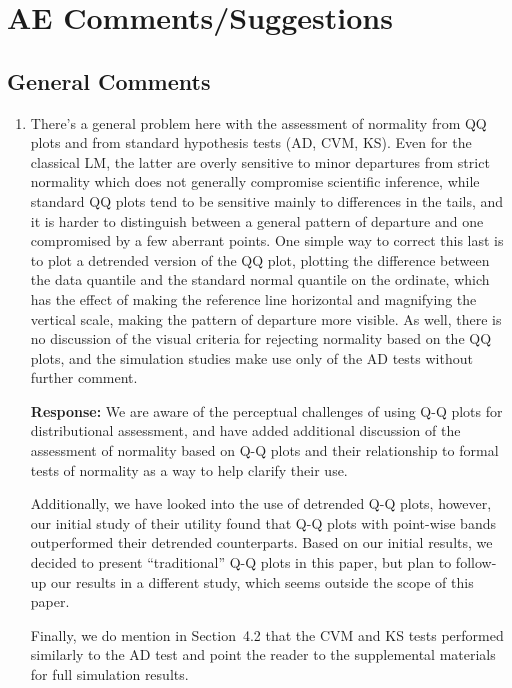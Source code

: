 \documentclass[11pt]{article}
\begin{document}
\section*{AE Comments/Suggestions}

\subsection*{General Comments}

\begin{enumerate}
\item There's a general problem here with the assessment of normality from QQ plots and from standard hypothesis tests (AD, CVM, KS). Even for the classical LM, the latter are overly sensitive to minor departures from strict normality which does not generally compromise scientific inference, while standard QQ plots tend to be sensitive mainly to differences in the tails, and it is harder to distinguish between a general pattern of departure and one compromised by a few aberrant points. One simple way to correct this last is to plot a detrended version of the QQ plot, plotting the difference between the data quantile and the standard normal quantile on the ordinate, which has the effect
of making the reference line horizontal and magnifying the vertical scale, making the pattern of departure more visible. As well, there is no discussion of the visual criteria for rejecting normality based on the QQ plots, and the simulation studies make use only of the AD tests without further comment.

\textbf{Response:} We are aware of the perceptual challenges of using Q-Q plots for distributional assessment, and have added additional discussion of the assessment of normality based on Q-Q plots and their relationship to formal tests of normality as a way to help clarify their use. 

Additionally, we have looked into the use of detrended Q-Q plots, however, our initial study of their utility found that Q-Q plots with point-wise bands outperformed their detrended counterparts. Based on our initial results, we decided to present ``traditional'' Q-Q plots in this paper, but plan to follow-up our results in a different study, which seems outside the scope of this paper.

Finally, we do mention in Section~4.2 that the CVM and KS tests performed similarly to the AD test and point the reader to the supplemental materials for full simulation results. 



\end{enumerate}
\end{document}
